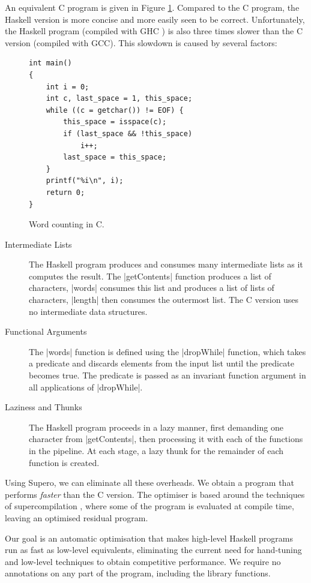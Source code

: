 An equivalent C program is given in Figure \ref{figS:c_words}. Compared to the C program, the Haskell version is more concise and more easily seen to be correct. Unfortunately, the Haskell program (compiled with GHC \cite{ghc}) is also three times slower than the C version (compiled with GCC). This slowdown is caused by several factors:

\begin{figure}
\begin{verbatim}
int main()
{
	int i = 0;
	int c, last_space = 1, this_space;
	while ((c = getchar()) != EOF) {
		this_space = isspace(c);
		if (last_space && !this_space)
			i++;
		last_space = this_space;
	}
	printf("%i\n", i);
	return 0;
}
\end{verbatim}
\caption{Word counting in C.}
\label{figS:c_words}
\end{figure}

\begin{description}
\item[Intermediate Lists] The Haskell program produces and consumes many intermediate lists as it computes the result. The |getContents| function produces a list of characters, |words| consumes this list and produces a list of lists of characters, |length| then consumes the outermost list. The C version uses no intermediate data structures.
\item[Functional Arguments] The |words| function is defined using the |dropWhile| function, which takes a predicate and discards elements from the input list until the predicate becomes true. The predicate is passed as an invariant function argument in all applications of |dropWhile|.
\item[Laziness and Thunks] The Haskell program proceeds in a lazy manner, first demanding one character from |getContents|, then processing it with each of the functions in the pipeline. At each stage, a lazy thunk for the remainder of each function is created.
\end{description}

Using Supero, we can eliminate all these overheads. We obtain a program that performs \textit{faster} than the C version. The optimiser is based around the techniques of supercompilation \cite{supercompilation}, where some of the program is evaluated at compile time, leaving an optimised residual program.

Our goal is an automatic optimisation that makes high-level Haskell programs run as fast as low-level equivalents, eliminating the current need for hand-tuning and low-level techniques to obtain competitive performance. We require no annotations on any part of the program, including the library functions.

